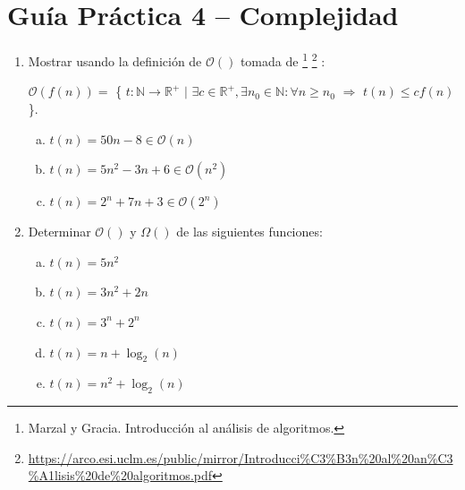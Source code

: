 




\section*{Gu\'ia Pr\'actica 4 -- Complejidad}

\begin{enumerate}
	\item Mostrar usando la definición de $\mathcal{O}()$ tomada de \footnote{Marzal y Gracia. Introducción al análisis de algoritmos.} \footnote{\href{https://arco.esi.uclm.es/public/mirror/Introducci\%C3\%B3n\%20al\%20an\%C3\%A1lisis\%20de\%20algoritmos.pdf}{https://arco.esi.uclm.es/public/mirror/Introducci\%C3\%B3n\%20al\%20an\%C3\%A1lisis\%20de\%20algoritmos.pdf}} : \\
	\vspace*{-7mm}
	\begin{center}
		$\mathcal{O}(f(n)) = $ \{ $t: \mathbb{N} \rightarrow \mathbb{R}^+$ $|$  $\exists c \in \mathbb{R}^+, 
		\exists n_0 \in \mathbb{N} : \forall n \geq n_0$  $\Rightarrow$   $t(n) \leq c f(n)$ \}.
	\end{center}
	
		\begin{enumerate}[a)]
			\item $t(n) = 50n-8 \in \mathcal{O}(n)$ 
			\item $t(n) = 5n^2-3n + 6 \in \mathcal{O}(n^2)$
			\item $t(n) = 2^n + 7n + 3 \in \mathcal{O}(2^n)$ 			
		\end{enumerate}
		
	\item Determinar $\mathcal{O}()$ y $\Omega()$ de las siguientes funciones:
		\begin{enumerate}[a)]
			\item $t(n) = 5n^2$ 
			\item $t(n) = 3n^2 + 2n$ 			
			\item $t(n) = 3^n + 2^n$ 
			\item $t(n) = n + \log_2(n)$ 			
			\item $t(n) = n^2 + \log_2(n)$ 			
		\end{enumerate}	
		

\end{enumerate}
